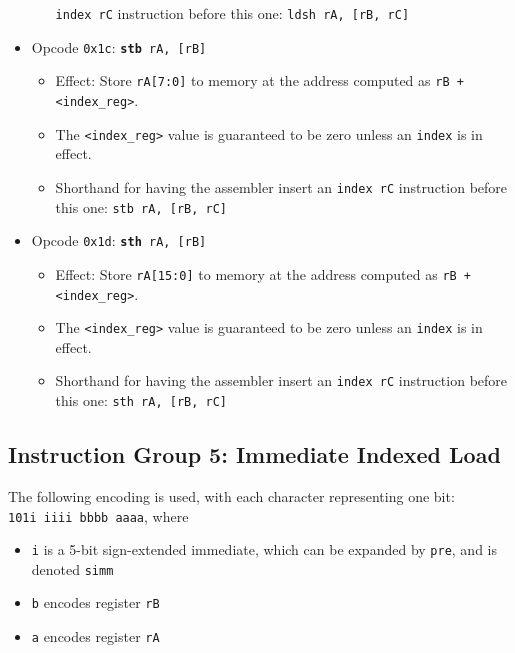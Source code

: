 \documentclass{article}
\begin{document}
\begin{itemize}
\begin{itemize}
		\texttt{index rC} instruction before this one:
			\texttt{ldsh rA, [rB, rC]}
		\end{itemize}
	\item Opcode \texttt{0x1c}:
		\texttt{\textbf{stb} rA, [rB]}
		\begin{itemize}
		\item Effect: Store \texttt{rA[7:0]} to memory at the address
		computed as \texttt{rB + <index\_reg>}.
		\item The \texttt{<index\_reg>} value is guaranteed to be zero
		unless an \texttt{index} is in effect.
		\item Shorthand for having the assembler insert an
		\texttt{index rC} instruction before this one:
			\texttt{stb rA, [rB, rC]}
		\end{itemize}
	\item Opcode \texttt{0x1d}:
		\texttt{\textbf{sth} rA, [rB]}
		\begin{itemize}
		\item Effect: Store \texttt{rA[15:0]} to memory at the address
		computed as \texttt{rB + <index\_reg>}.
		\item The \texttt{<index\_reg>} value is guaranteed to be zero
		unless an \texttt{index} is in effect.
		\item Shorthand for having the assembler insert an
		\texttt{index rC} instruction before this one:
			\texttt{sth rA, [rB, rC]}
		\end{itemize}
	\end{itemize}

	\doublespacing
	\subsection{Instruction Group 5: Immediate Indexed Load}
	The following encoding is used, with each character representing one
	bit: \\
	\texttt{101i iiii bbbb aaaa}, where

	\singlespacing
	\begin{itemize}
	\item \texttt{i} is a 5-bit sign-extended immediate, which can
	be expanded by \texttt{pre}, and is denoted \texttt{simm}
	\item \texttt{b} encodes register \texttt{rB}
	\item \texttt{a} encodes register \texttt{rA}
	\end{itemize}
	\doublespacing
\end{document}
